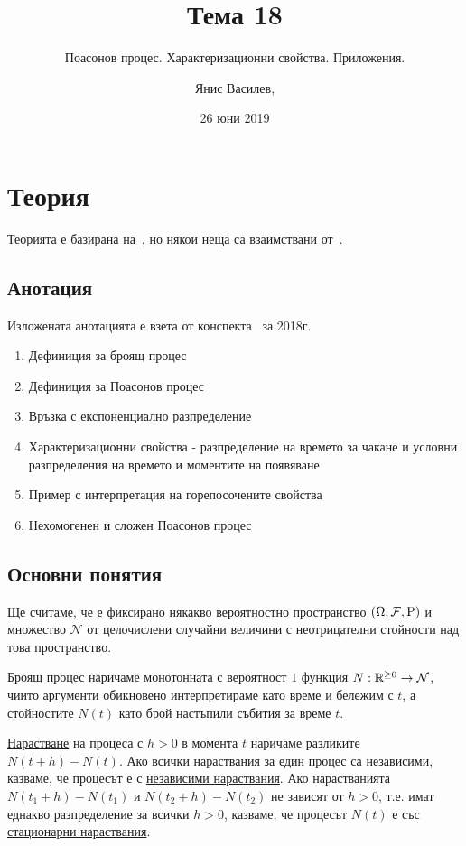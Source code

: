 \documentclass[numbers=endperiod, DIV=15, bibliography=totocnumbered]{scrartcl}
\title{Тема 18}
\subtitle{Поасонов процес. Характеризационни свойства. Приложения.}
\author{Янис Василев, \Email{ianis@ivasilev.net}}
\date{26 юни 2019}
\begin{document}
\maketitle

\section{Теория}

Теорията е базирана на~\cite{Lectures}, но някои неща са взаимствани от~\cite{Borovkov}.

\subsection{Анотация}

Изложената анотацията е взета от конспекта~\cite{Syllabus} за 2018г.

\begin{enumerate}
  \item Дефиниция за броящ процес
  \item Дефиниция за Поасонов процес
  \item Връзка с експоненциално разпределение
  \item Характеризационни свойства - разпределение на времето за чакане и условни разпределения на времето и моментите на появяване
  \item Пример с интерпретация на горепосочените свойства
  \item Нехомогенен и сложен Поасонов процес
\end{enumerate}

\subsection{Основни понятия}

Ще считаме, че е фиксирано някакво вероятностно пространство $(\Omega, \mathcal{F}, \operatorname{P})$ и множество $\mathcal{N}$ от целочислени случайни величини с неотрицателни стойности над това пространство.

\begin{definition}
  \uline{Броящ процес} наричаме монотонната с вероятност $1$ функция $N: \mathbb{R}^{\geq 0} \to \mathcal{N}$, чиито аргументи обикновено интерпретираме като време и бележим с $t$, а стойностите $N(t)$ като брой настъпили събития за време $t$.

  \uline{Нарастване} на процеса с $h > 0$ в момента $t$ наричаме разликите $N(t+h) - N(t)$. Ако всички нараствания за един процес са независими, казваме, че процесът е с \uline{независими нараствания}. Ако нарастванията $N(t_1+h) - N(t_1)$ и $N(t_2+h) - N(t_2)$ не зависят от $h>0$, т.е. имат еднакво разпределение за всички $h>0$, казваме, че процесът $N(t)$ е със \uline{стационарни нараствания}.
\end{definition}
\end{document}
